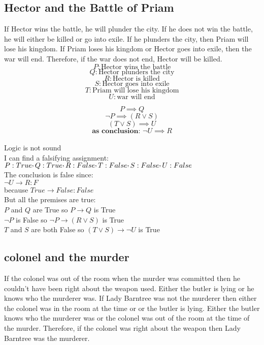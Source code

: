 \documentclass[a4paper,12pt]{article}
\newcommand{\CommaPunct}{\mathpunct{\raisebox{0.5ex}{,}}}
\begin{document}
\subsection{Hector and the Battle of Priam} 
If Hector wins the battle, he will plunder the city.  If he does not win the battle, he will either be killed or go into exile.  If he plunders the city, then Priam will lose his kingdom.  If Priam loses his kingdom or Hector goes into exile, then the war will end.  Therefore, if the war does not end, Hector will be killed. 
\[
P: \text{Hector wins the battle} 
\]
\[
Q: \text{Hector plunders the city} 
\]
\[
R: \text{Hector is killed} 
\]
\[
S: \text{Hector goes into exile}
\]
\[
T: \text{Priam will lose his kingdom}
\]
\[
U: \text{war will end}
\]

\begin{equation} 
P \implies Q 
\end{equation}
\begin{equation} 
\neg P \implies (R \vee S)
\end{equation}
\begin{equation} 
(T \vee S) \implies U
\end{equation}
\begin{equation} 
\textbf{as conclusion: } \neg U \implies R
\end{equation}\\
Logic is not sound\\
I can find a falsifying assignment:\\
$P:True \CommaPunct Q:True \CommaPunct R:False\CommaPunct T:False \CommaPunct S:False \CommaPunct  U:False$\\
The conclusion is false since:\\
$\lnot U \rightarrow R : F$\\
because $True \rightarrow False : False$\\
But all the premises are true:\\
$P$ and $Q$ are True so $P \rightarrow Q$ is True\\
$\lnot P$ is False so $ \neg P \rightarrow(R \vee S)$ is True\\
$T$ and $S$ are both False so $ (T \vee S) \rightarrow \lnot U$ is True\\

\subsection{colonel and the murder}
If the colonel was out of the room when the murder was committed then he couldn't have been right about the weapon used.  Either the butler is lying or he knows who the murderer was.  If Lady Barntree was not the murderer then either the colonel was in the room at the time or or the butler is lying.  Either the butler knows who the murderer was or the colonel was out of the room at the time of the murder.  Therefore, if the colonel was right about the weapon then Lady Barntree was the murderer.
\end{document}
